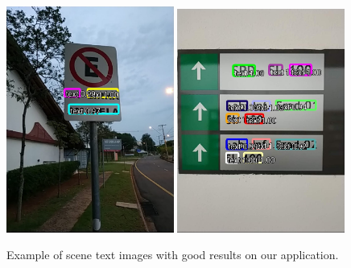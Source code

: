\begin{figure}[h!]
\includegraphics[width=0.49\textwidth]{Mobile/images/app07.jpg}
\includegraphics[width=0.49\textwidth]{Mobile/images/app11.jpg}


\caption{Example of scene text images with good results on our application.}
\label{fig:sample_good}
\end{figure}

